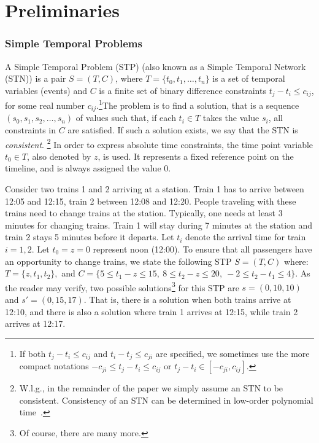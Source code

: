 
\section{Preliminaries} \label{section:prelim}

\subsubsection{Simple Temporal Problems }
A Simple Temporal Problem (STP) (also known as a Simple Temporal Network (STN)) is a pair $S = (T,C)$, 
where $T = \{t_{0},t_{1}, \ldots, t_{n}\}$ is a set of temporal variables (events) and 
$C$ is a finite set of binary difference constraints $t_{j}-t_{i}\leq c_{ij}$, for some real number $c_{ij}$.\footnote{If both $t_{j}-t_{i}\leq c_{ij}$ and $t_{i}-t_{j}\leq c_{ji}$ are specified, we sometimes use the more compact notations $- c_{ji}\leq t_j - t_i \leq c_{ij}$ or $t_j - t_i  \in [-c_{ji},c_{ij}]$.}The problem is to find a solution, that is a sequence $(s_0, s_1,s_2, \ldots, s_n)$ of values such that, if each $t_i \in T$ takes the value $s_i$, all constraints in $C$ are satisfied.
If such a solution exists, we say that the STN is \emph{consistent}. \footnote{W.l.g., in the remainder of the paper we simply assume an STN to be consistent. Consistency of an STN can be determined in low-order polynomial time~\cite{dechter1991}.}
In order to express absolute time constraints, the time point variable $t_{0} \in T$, also denoted by $z$, is used. It represents a fixed reference point on the timeline, and is always assigned the value $0$. 
\begin{example} \label{ex.1}
Consider two trains 1 and 2 arriving at a station. Train 1 has to arrive between 12:05 and 12:15, train 2 between 12:08 and 12:20. 
People traveling with these trains need to change trains at the station. Typically, one needs at least 3 minutes for changing trains. 
Train 1 will stay during 7 minutes at the station and train 2 stays 5 minutes before it departs.
Let $t_i$ denote the arrival time for train $i =1, 2$. Let $t_0 =z = 0$ represent noon (12:00). To ensure that all passengers have an opportunity to change trains, we state the following
STP $S = (T, C)$ where:
$T = \{ z, t_1, t_2 \},$ and $C = \{  5 \leq  t_1 - z \leq 15, \  8 \leq t_2 - z \leq 20, \  -2 \leq t_2 - t_1 \leq 4  \}$.
As the reader may verify, two possible solutions\footnote{Of course, there are many more.} for this STP are $s = (0,10,10)$ and $s' = (0, 15,17)$. 
That is, there is a solution when both trains arrive at 12:10, and there is also a solution where train 1 arrives at 12:15, while train 2 arrives at 12:17.\blbox
\end{example}
